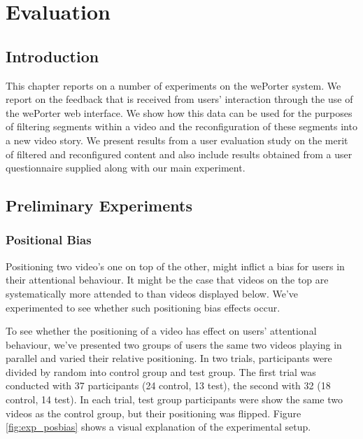 \chapter{Evaluation}
\label{ch:evaluation}

\section{Introduction} %
\label{sec:evaluation_introduction}

This chapter reports on a number of experiments on the wePorter system. We report on the feedback that is received from users' interaction through the use of the wePorter web interface. We show how this data can be used for the purposes of filtering segments within a video and the reconfiguration of these segments into a new video story. We present results from a user evaluation study on the merit of filtered and reconfigured content and also include results obtained from a user questionnaire supplied along with our main experiment.


\section{Preliminary Experiments}
\label{sec:preliminary_experiments}

\subsection{Positional Bias}
Positioning two video's one on top of the other, might inflict a bias for users in their attentional behaviour. It might be the case that videos on the top are systematically more attended to than videos displayed below. We've experimented to see whether such positioning bias effects occur.

To see whether the positioning of a video has effect on users' attentional behaviour, we've presented two groups of users the same two videos playing in parallel and varied their relative positioning. In two trials, participants were divided by random into control group and test group. The first trial was conducted with 37 participants (24 control, 13 test), the second with 32 (18 control, 14 test). In each trial, test group participants were show the same two videos as the control group, but their positioning was flipped. Figure \ref{fig:exp_posbias} shows a visual explanation of the experimental setup.

